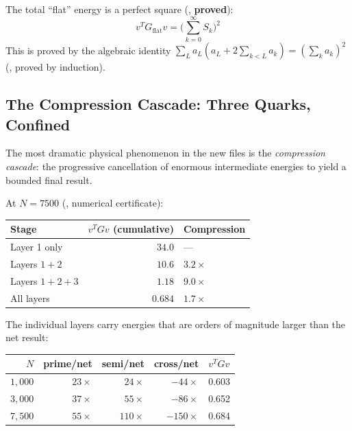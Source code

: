 \begin{observation}
The total ``flat'' energy is a perfect square
(, \textbf{proved}):
\[
  v^T G_{\text{flat}} v = \Biggl(\sum_{k=0}^{\infty} S_k\Biggr)^{\!2}
\]
This is proved by the algebraic identity
$\sum_L a_L(a_L + 2\sum_{k<L} a_k) = (\sum_k a_k)^2$
(, proved by induction).
\end{observation}

\subsection{The Compression Cascade: Three Quarks, Confined}
\label{sec:compression}

The most dramatic physical phenomenon in the new files is the
\emph{compression cascade}: the progressive cancellation of
enormous intermediate energies to yield a bounded final result.

At $N = 7500$ (, numerical certificate):
\begin{center}
\begin{tabular}{@{}lrl@{}}
\toprule
\textbf{Stage} & \textbf{$v^T G v$ (cumulative)} & \textbf{Compression} \\
\midrule
Layer 1 only            & $34.0$  & --- \\
Layers $1{+}2$          & $10.6$  & $3.2\times$ \\
Layers $1{+}2{+}3$      & $1.18$  & $9.0\times$ \\
All layers              & $0.684$ & $1.7\times$ \\
\bottomrule
\end{tabular}
\end{center}

The individual layers carry energies that are orders of magnitude
larger than the net result:
\begin{center}
\small
\begin{tabular}{@{}rrrrl@{}}
\toprule
$N$ & \textbf{prime/net} & \textbf{semi/net} & \textbf{cross/net} & $v^T G v$ \\
\midrule
$1{,}000$  & $23\times$ & $24\times$ & $-44\times$ & 0.603 \\
$3{,}000$  & $37\times$ & $55\times$ & $-86\times$ & 0.652 \\
$7{,}500$  & $55\times$ & $110\times$ & $-150\times$ & 0.684 \\
\bottomrule
\end{tabular}
\end{center}

